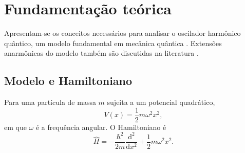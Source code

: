 \chapter{Fundamentação teórica}
\label{cap:fundamentacao}

Apresentam-se os conceitos necessários para analisar o oscilador harmônico
quântico, um modelo fundamental em mecânica quântica
\cite{griffiths2018}. Extensões anarmônicas do modelo também são discutidas
na literatura \cite{bender1969}.

\section{Modelo e Hamiltoniano}

Para uma partícula de massa \(m\) sujeita a um potencial quadrático,
\begin{equation}
  V(x) = \frac{1}{2}m\omega^2x^2,
  \label{eq:potencial}
\end{equation}
em que \(\omega\) é a frequência angular. O Hamiltoniano é
\begin{equation}
  \hat{H}
  = -\frac{\hbar^2}{2m}\frac{\mathrm{d}^2}{\mathrm{d}x^2}
    + \frac{1}{2}m\omega^2x^2.
  \label{eq:hamiltoniano}
\end{equation}




